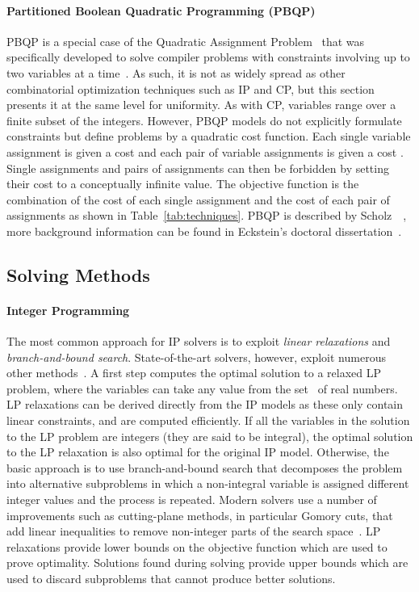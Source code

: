 \documentclass[acmsmall,authorversion,nonacm]{acmart}
\begin{document}
\paragraph{Partitioned Boolean Quadratic Programming (PBQP)}

PBQP is a special case of the Quadratic Assignment
Problem~\cite{Koopmans1957} that was specifically developed to solve
compiler problems with constraints involving up to two variables at a
time~\cite{Scholz2002,Eckstein2003,Eckstein2003b}.
As such, it is not as widely spread as other combinatorial
optimization techniques such as IP and CP, but this section presents
it at the same level for uniformity.
As with CP, variables range over a finite subset
 of the integers.
However, PBQP models do not explicitly formulate constraints but
define problems by a quadratic cost function.
Each single variable assignment  is given a cost  and
each pair of variable assignments  is given a cost
.
Single assignments and pairs of assignments can then be forbidden by
setting their cost to a conceptually infinite value.
The objective function is the combination of the cost of each single
assignment and the cost of each pair of assignments as shown in
Table~\ref{tab:techniques}.
PBQP is described by Scholz~\etal{}~\cite{Scholz2002,Hames2006}, more
background information can be found in Eckstein's doctoral
dissertation~\cite{Eckstein2003c}.

\subsection{Solving Methods}\label{sec:solving}

\paragraph{Integer Programming}

The most common approach for IP solvers is to exploit \emph{linear
  relaxations} and \emph{branch-and-bound search}.
State-of-the-art solvers, however, exploit numerous other
methods~\cite{Nemhauser1999}.
A first step computes the optimal solution to a relaxed LP problem,
where the variables can take any value from the set~ of real
numbers.
LP relaxations can be derived directly from the IP models as these
only contain linear constraints, and are computed efficiently.
If all the variables in the solution to the LP problem are integers
(they are said to be integral), the optimal solution to the LP
relaxation is also optimal for the original IP model.
Otherwise, the basic approach is to use branch-and-bound search that
decomposes the problem into alternative subproblems in which a
non-integral variable is assigned different integer values and the
process is repeated. Modern solvers use a number of improvements such
as cutting-plane methods, in particular Gomory cuts, that add linear
inequalities to remove non-integer parts of the search
space~\cite{Nemhauser1999}.
LP relaxations provide lower bounds on the objective function which
are used to prove optimality.
Solutions found during solving provide upper bounds which are used to
discard subproblems that cannot produce better solutions.
\end{document}
